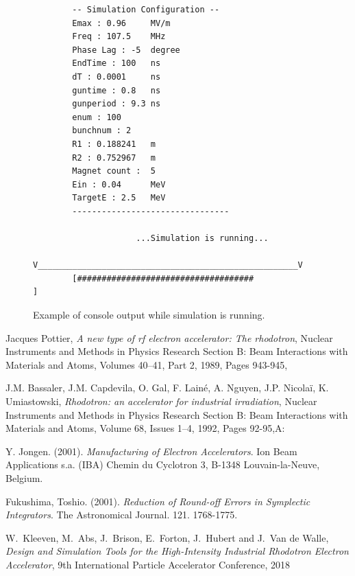 \documentclass[a4paper,oneside,12pt]{report}
\numberwithin{equation}{chapter}
\begin{document}
\begin{figure}[H]
    \centering
    \captionsetup{justification=centering}
    \begin{verbatim}
        -- Simulation Configuration --
        Emax : 0.96     MV/m
        Freq : 107.5    MHz
        Phase Lag : -5  degree
        EndTime : 100   ns
        dT : 0.0001     ns
        guntime : 0.8   ns
        gunperiod : 9.3 ns
        enum : 100
        bunchnum : 2
        R1 : 0.188241   m
        R2 : 0.752967   m
        Magnet count :  5
        Ein : 0.04      MeV
        TargetE : 2.5   MeV
        --------------------------------
        
                     ...Simulation is running...
        V_____________________________________________________V
        [####################################                 ]
    \end{verbatim}
\caption{Example of console output while simulation is running.}
\label{fig:console_output_running}
\end{figure}







\begin{thebibliography}{9}

    Jacques Pottier,
    \emph{A new type of rf electron accelerator: The rhodotron},
    Nuclear Instruments and Methods in Physics Research Section B: Beam Interactions with Materials and Atoms,
    Volumes 40–41, Part 2,
    1989,
    Pages 943-945,

    J.M. Bassaler, J.M. Capdevila, O. Gal, F. Lainé, A. Nguyen, J.P. Nicolaï, K. Umiastowski,
    \emph{Rhodotron: an accelerator for industrial irradiation},
    Nuclear Instruments and Methods in Physics Research Section B: Beam Interactions with Materials and Atoms,
    Volume 68, Issues 1–4,
    1992,
    Pages 92-95,A:

    Y. Jongen. (2001). \emph{Manufacturing of Electron Accelerators}. Ion Beam Applications s.a. (IBA) Chemin du Cyclotron 3, B-1348 Louvain-la-Neuve, Belgium.

    Fukushima, Toshio. (2001). \emph{Reduction of Round-off Errors in Symplectic Integrators}. The Astronomical Journal. 121. 1768-1775. 

    W.~Kleeven, M.~Abs, J.~Brison, E.~Forton, J.~Hubert and J.~Van de Walle,
    \emph{Design and Simulation Tools for the High-Intensity Industrial Rhodotron Electron Accelerator},
    9th International Particle Accelerator Conference,
    2018
    
    
\end{thebibliography}

\end{document}

